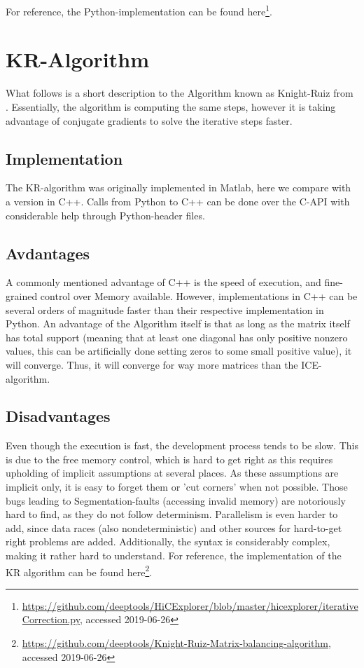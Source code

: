 For reference, the Python-implementation can be found
here\footnote{\url{https://github.com/deeptools/HiCExplorer/blob/master/hicexplorer/iterativeCorrection.py},
accessed 2019-06-26}.



\section{KR-Algorithm}\label{sec:KR}

What follows is a short description to the Algorithm known as Knight-Ruiz from
\cite{knight2013fast}. Essentially, the algorithm is computing the same steps,
however it is taking advantage of conjugate gradients to solve the iterative
steps faster.

\subsection{Implementation}

The KR-algorithm was originally implemented in Matlab, here we compare with a
version in C++. Calls from Python to C++ can be done over the C-API with
considerable help through Python-header files.

\subsection{Avdantages}

A commonly mentioned advantage of C++ is the speed of execution, and
fine-grained control over Memory available. However, implementations in C++ can
be several orders of magnitude faster than their respective implementation in
Python. An advantage of the Algorithm itself is that as long as the matrix
itself has total support (meaning that at least one diagonal has only positive
nonzero values, this can be artificially done setting zeros to some small
positive value), it will converge. Thus, it will converge for way more matrices
than the ICE-algorithm.

\subsection{Disadvantages}

Even though the execution is fast, the development process tends to be slow.
This is due to the free memory control, which is hard to get right as this
requires upholding of implicit assumptions at several places. As these
assumptions are implicit only, it is easy to forget them or 'cut corners' when
not possible. Those bugs leading to Segmentation-faults (accessing invalid
memory) are notoriously hard to find, as they do not follow determinism.
Parallelism is even harder to add, since data races (also nondeterministic) and
other sources for hard-to-get right problems are added. Additionally, the
syntax is considerably complex, making it rather hard to understand.
For reference, the implementation of the KR algorithm can be found
here\footnote{\url{https://github.com/deeptools/Knight-Ruiz-Matrix-balancing-algorithm},
\\ accessed 2019-06-26}.

